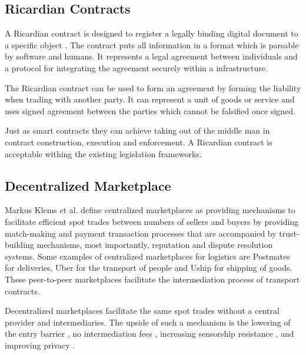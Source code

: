 \subsection{Ricardian Contracts}

A Ricardian contract is designed to register a legally binding digital document to a specific object \cite{grigg2004ricardian}. The contract puts all information in a format which is parsable by software and humans. It represents a legal agreement between individuals and a protocol for integrating the agreement securely within a infrastructure. \par
The Ricardian contract can be used to form an agreement by forming the liability when trading with another party. It can represent a unit of goods or service and uses signed agreement between the parties which cannot be falsified once signed. \par
Just as smart contracts \cite{sc} they can achieve taking out of the middle man in contract construction, execution and enforcement. A Ricardian contract is acceptable withing the existing legislation frameworks.

\subsection{Decentralized Marketplace}

Markus Klems et al. define centralized marketplaces\cite{trustlessIntermediationInBCServiceMarket} as providing mechanisms to facilitate efficient spot trades between numbers of sellers and buyers by providing match-making and payment transaction processes that are accompanied by trust-building mechanisms, most importantly, reputation and dispute resolution systems. Some examples of centralized marketplaces for logistics are Postmates for deliveries, Uber for the transport of people and Uship for shipping of goods. These peer-to-peer marketplaces facilitate the intermediation process of transport contracts.\par
Decentralized marketplaces facilitate the same spot trades without a central provider and intermediaries. The upside of such a mechanism is the lowering of the entry barrier \cite{einav2016peer}, no intermediation fees \cite{openbazaar}, increasing sensorship resistance \cite{decentralMarket}, and improving privacy \cite{decentralizedAnonymousReputation}.


